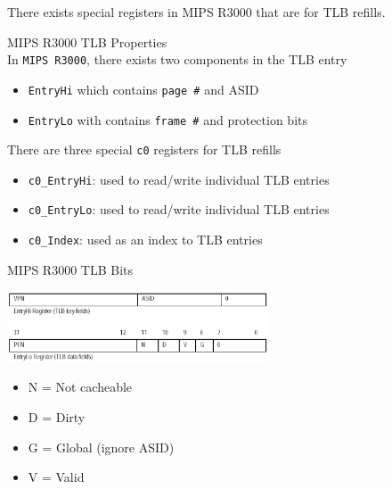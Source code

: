 \documentclass[journal, letterpaper]{IEEEtran}
\begin{document}
There exists special registers in MIPS R3000 that are for TLB refills.
\begin{theory}{MIPS R3000 TLB Properties} \\
    In \verb|MIPS R3000|, there exists two components in the TLB entry
    \begin{itemize}
        \item \verb|EntryHi| which contains \verb|page #| and ASID
        \item \verb|EntryLo| with contains \verb|frame #| and protection bits
    \end{itemize} 
    There are three special \verb|c0| registers for TLB refills
    \begin{itemize}
        \item \verb|c0_EntryHi|: used to read/write individual TLB entries
        \item \verb|c0_EntryLo|: used to read/write individual TLB entries
        \item \verb|c0_Index|: used as an index to TLB entries
    \end{itemize}
\end{theory}
\begin{aside}{MIPS R3000 TLB Bits}
    \begin{center}
        \includegraphics[width=7.75cm]{./photos/r3000_entry.png}
    \end{center}
    \begin{itemize}
        \item N = Not cacheable
        \item D = Dirty
        \item G = Global (ignore ASID)
        \item V = Valid
    \end{itemize}
\end{aside}
\end{document}

